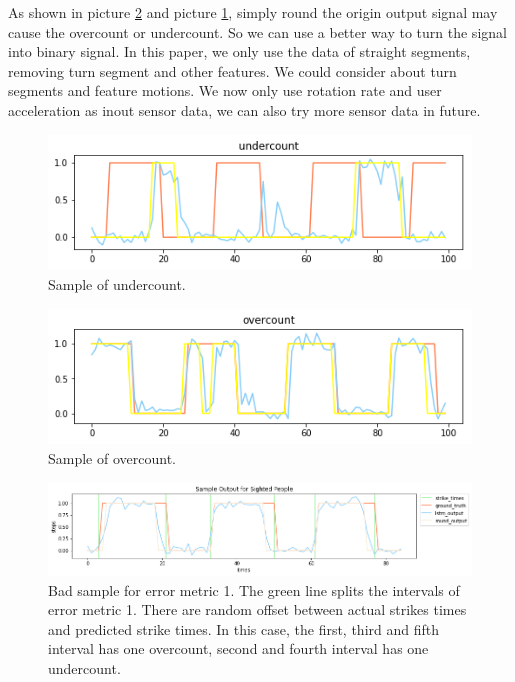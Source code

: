 \documentclass[11pt]{article}
\begin{document}
{As shown in picture \ref{fig:overcount} and picture \ref{fig:undercount}, simply round the origin output signal may cause the overcount or undercount. So we can use a better way to turn the signal into binary signal. In this paper, we only use the data of straight segments, removing turn segment and other features. We could consider about turn segments and feature motions. We now only use rotation rate and user acceleration as inout sensor data, we can also try more sensor data in future.

\begin{figure}[ht]
\centering
\includegraphics[scale=0.4]{undercount}
\caption{Sample of undercount.}
\label{fig:undercount}
\end{figure}

\begin{figure}[ht]
\centering
\includegraphics[scale=0.4]{overcount}
\caption{Sample of overcount.}
\label{fig:overcount}
\end{figure}


\begin{figure}[ht]
\centering
\includegraphics[scale=0.5]{output_small_metric2}
\caption{Bad sample for error metric 1. The green line splits the intervals of error metric 1. There are random offset between actual strikes times and predicted strike times. In this case, the first, third and fifth interval has one overcount, second and fourth interval has one undercount.}
\label{fig:output_small_metric2}
\end{figure}




}
\end{document}
